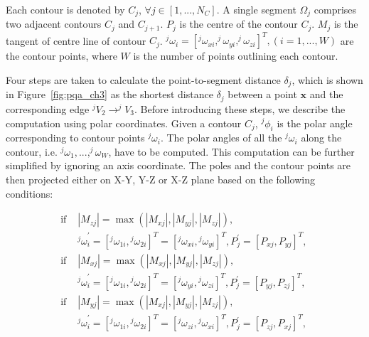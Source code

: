 \begin{mydef}
Each contour is denoted by $C_j$, $\forall j \in [1,...,N_C]$.
A single segment $\Omega_j$ comprises two adjacent contours $C_j$ and $C_{j+1}$.
$P_j$ is the centre of the contour $C_j$.
$M_j$ is the tangent of centre line of contour $C_j$.
$^j\omega_i=[^j\omega_{xi},^j\omega_{yi},^j\omega_{zi}]^T, (i=1,...,W)$ are the contour points,
where $W$ is the number of points outlining each contour.
\end{mydef}

Four steps are taken to calculate the point-to-segment distance $\delta_j$, which is shown in Figure~\ref{fig:pqa_ch3} as the shortest distance $\delta_j$ between a point $\boldsymbol{x}$ and the corresponding edge $^jV_2 \rightarrow ^jV_3$.
Before introducing these steps, we describe the computation using polar coordinates.
Given a contour $C_j$, $^j\phi_i$ is the polar angle corresponding to contour points $^j\omega_i$.
The polar angles of all the $^j\omega_i$ along the contour, i.e. $^j\omega_1, ..., ^j\omega_W$, have to be computed. 
This computation can be further simplified by ignoring an axis coordinate. 
The poles and the contour points are then projected either on X-Y, Y-Z or X-Z plane based on the following conditions:   

\begin{equation}
\begin{aligned}
\mbox{if } &|M_{zj}| = \max \left ( {|M_{xj}|,|M_{yj}|,|M_{zj}|} \right ) \mbox{, } \\
&{^j\omega}^{\prime}_i = [{^j\omega}_{1i},{^j\omega}_{2i}]^T = [{^j\omega}_{xi},{^j\omega}_{yi}]^T, P^{\prime}_j=[P_{xj},P_{yj}]^T \mbox{, } \\
\mbox{if } &|M_{xj}| = \max \left ( {|M_{xj}|,|M_{yj}|,|M_{zj}|} \right ) \mbox{, } \\
&{^j\omega}^{\prime}_i = [{^j\omega}_{1i},{^j\omega}_{2i}]^T = [{^j\omega}_{yi},{^j\omega}_{zi}]^T, P^{\prime}_j=[P_{yj},P_{zj}]^T \mbox{, } \\
\mbox{if } &|M_{yj}| = \max \left ( {|M_{xj}|,|M_{yj}|,|M_{zj}|} \right ) \mbox{, } \\
&{^j\omega}^{\prime}_i = [{^j\omega}_{1i},{^j\omega}_{2i}]^T = [{^j\omega}_{zi},{^j\omega}_{xi}]^T, P^{\prime}_j=[P_{zj},P_{xj}]^T \mbox{, } 
\end{aligned}
\label{eqt:preprocess1}
\end{equation}

